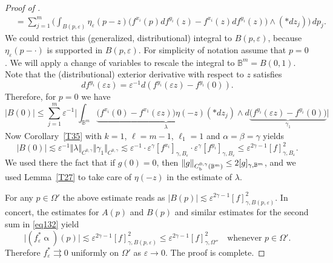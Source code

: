 \documentclass[intlimits,12pt,reqno]{amsart}
\newcommand{\bbbb}{\mathbb B}
\newcommand{\eps}{\varepsilon}
\numberwithin{equation}{section}
\theoremstyle{definition}
\begin{document}
\begin{proof}[Proof of ]
\[\begin{split}
&=
\sum_{j=1}^m
\bigg(\int_{B(p,\eps)}
\eta_\eps(p-z)
\big(f^{x_i}(p)df^{y_i}(z)-f^{x_i}(z)df^{y_i}(z)\big)
\wedge (*dz_j)\bigg)\, dp_j.
\end{split}
\]
We could restrict this (generalized, distributional) integral to $B(p,\eps)$, because
$\eta_\eps(p-\cdot)$ is supported in $B(p,\eps)$. For simplicity of notation assume that $p=0$. We will apply a change of variables to rescale the integral to $\bbbb^m=B(0,1)$. Note that the (distributional) exterior derivative with respect to $z$ satisfies
$$
df^{y_i}(\eps z)=\eps^{-1}d(f^{y_i}(\eps z)-f^{y_i}(0)). 
$$
Therefore, for $p=0$ we have
$$
|B(0)|\leq
\sum_{j=1}^m \eps^{-1}
\bigg|\int_{\bbbb^m}\underbrace{\big(f^{x_i}(0)-f^{x_1}(\eps z)\big)\eta(-z)(*dz_j)}_{\lambda}
\wedge d\underbrace{\big(f^{y_i}(\eps z)-f^{y_i}(0)\big)}_{\gamma_1}\bigg|
$$
Now Corollary~\ref{T35} with $k=1$, $\ell=m-1$, $\ell_1=1$ and $\alpha=\beta=\gamma$ yields
\[
|B(0)|\lesssim\eps^{-1}\Vert\lambda\Vert_{C^{0,\gamma}}\Vert\gamma_1\Vert_{C^{0,\gamma}}
\lesssim
\eps^{-1}\cdot\eps^\gamma [f^{x_i}]_{\gamma,B_\eps}\cdot\eps^\gamma[f^{y_i}]_{\gamma,B_\eps}
\leq
\eps^{2\gamma-1}[f]^2_{\gamma,B_\eps}.
\]
We used there the fact that if $g(0)=0$, then 
$\Vert g\Vert_{C_{\rm b}^{0,\gamma}(\bbbb^m)}\leq 2[g]_{\gamma,\bbbb^m}$, and we used Lemma~\ref{T27} to take care of $\eta(-z)$ in the estimate of $\lambda$.

For any $p\in\Omega'$ the above estimate reads as
$|B(p)|\lesssim\eps^{2\gamma-1}[f]^2_{\gamma,B(p,\eps)}$.
In concert, the estimates for $A(p)$ and $B(p)$ and similar estimates for the second sum in \eqref{eq132} yield
$$
\big|(f_\eps^*\upalpha)(p)\big|\lesssim
\eps^{2\gamma-1}[f]^2_{\gamma,B(p,\eps)}\leq
\eps^{2\gamma-1}[f]^2_{\gamma,\Omega''}
\quad
\text{whenever } p\in\Omega'.
$$
Therefore $f^*_\eps\rightrightarrows 0$ uniformly on $\Omega'$ as $\eps\to 0$. The proof is complete.
\end{proof}
\end{document}

